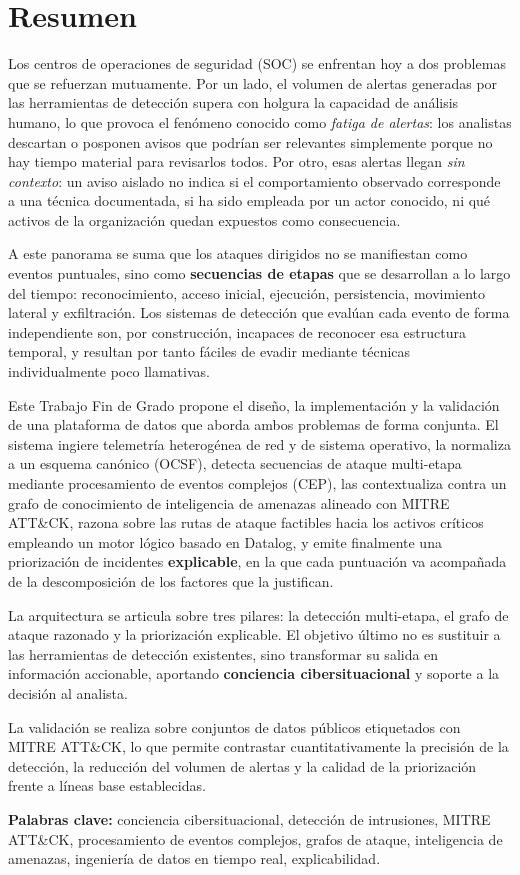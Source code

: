 \chapter*{Resumen}

Los centros de operaciones de seguridad (SOC) se enfrentan hoy a dos problemas que se
refuerzan mutuamente. Por un lado, el volumen de alertas generadas por las herramientas
de detección supera con holgura la capacidad de análisis humano, lo que provoca el
fenómeno conocido como \textit{fatiga de alertas}: los analistas descartan o posponen
avisos que podrían ser relevantes simplemente porque no hay tiempo material para
revisarlos todos. Por otro, esas alertas llegan \textit{sin contexto}: un aviso aislado no
indica si el comportamiento observado corresponde a una técnica documentada, si ha sido
empleada por un actor conocido, ni qué activos de la organización quedan expuestos como
consecuencia.

A este panorama se suma que los ataques dirigidos no se manifiestan como eventos puntuales,
sino como \textbf{secuencias de etapas} que se desarrollan a lo largo del tiempo:
reconocimiento, acceso inicial, ejecución, persistencia, movimiento lateral y exfiltración.
Los sistemas de detección que evalúan cada evento de forma independiente son, por
construcción, incapaces de reconocer esa estructura temporal, y resultan por tanto fáciles
de evadir mediante técnicas individualmente poco llamativas.

Este Trabajo Fin de Grado propone el diseño, la implementación y la validación de una
plataforma de datos que aborda ambos problemas de forma conjunta. El sistema ingiere
telemetría heterogénea de red y de sistema operativo, la normaliza a un esquema canónico
(OCSF), detecta secuencias de ataque multi-etapa mediante procesamiento de eventos
complejos (CEP), las contextualiza contra un grafo de conocimiento de inteligencia de
amenazas alineado con MITRE ATT\&CK, razona sobre las rutas de ataque factibles hacia los
activos críticos empleando un motor lógico basado en Datalog, y emite finalmente una
priorización de incidentes \textbf{explicable}, en la que cada puntuación va acompañada de
la descomposición de los factores que la justifican.

La arquitectura se articula sobre tres pilares: la detección multi-etapa, el grafo de
ataque razonado y la priorización explicable. El objetivo último no es sustituir a las
herramientas de detección existentes, sino transformar su salida en información accionable,
aportando \textbf{conciencia cibersituacional} y soporte a la decisión al analista.

La validación se realiza sobre conjuntos de datos públicos etiquetados con MITRE ATT\&CK,
lo que permite contrastar cuantitativamente la precisión de la detección, la reducción del
volumen de alertas y la calidad de la priorización frente a líneas base establecidas.

\vspace{1em}
\noindent\textbf{Palabras clave:} conciencia cibersituacional, detección de intrusiones,
MITRE ATT\&CK, procesamiento de eventos complejos, grafos de ataque, inteligencia de
amenazas, ingeniería de datos en tiempo real, explicabilidad.
